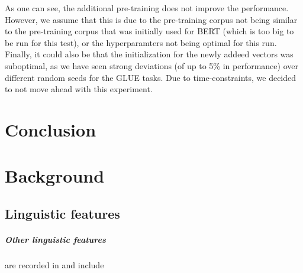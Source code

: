 \documentclass[a4paper,12pt,twoside,openright]{report}
\begin{document}
As one can see, the additional pre-training does not improve the performance.
However, we assume that this is due to the pre-training corpus not being similar to the pre-training corpus that was initially used for BERT (which is too big to be run for this test), or the hyperparamters not being optimal for this run.
Finally, it could also be that the initialization for the newly addeed vectors was suboptimal, as we have seen strong deviations (of up to 5\% in performance) over different random seeds for the GLUE tasks.
Due to time-constraints, we decided to not move ahead with this experiment.

\chapter{Conclusion}\label{section:Conclusion}

\appendix
\singlespacing

%  

 

\chapter{Background}

\section{Linguistic features}\label{appendix:linguistic_features}

\paragraph{Other linguistic features} are recorded in \cite{wang19} and include
\end{document}
